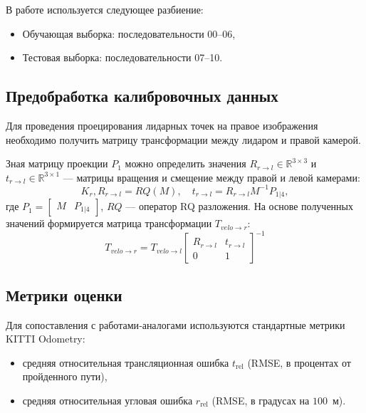 В работе используется следующее разбиение:
\begin{itemize}
    \item Обучающая выборка: последовательности 00--06,
    \item Тестовая выборка: последовательности 07--10.
\end{itemize}


\subsection{Предобработка калибровочных данных}
Для проведения проецирования лидарных точек на правое изображения необходимо получить 
матрицу трансформации между лидаром и правой камерой.

Зная матрицу проекции $P_1$ можно определить значения 
$R_{r\rightarrow l} \in \mathbb{R}^{3\times 3}$ и $t_{r \rightarrow l} \in \mathbb{R}^{3\times 1}$ ---
матрицы вращения и смещение между правой и левой камерами:
\begin{equation*}
  K_{r}, R_{r\rightarrow l} = RQ(M), \quad t_{r \rightarrow l} = R_{r\rightarrow l}M^{-1}P_{1|4},
\end{equation*}
где $P_1 = \begin{bmatrix}
  M & P_{1|4}
\end{bmatrix}$, $RQ$ --- оператор RQ разложения. На основе полученных значений формируется матрица трансформации $T_{velo\rightarrow r}$:
\begin{equation*}
  T_{velo\rightarrow r} = T_{velo\rightarrow l} \begin{bmatrix}
    R_{r\rightarrow l} & t_{r \rightarrow l} \\ 0  & 1
  \end{bmatrix}^{-1}
\end{equation*}

\subsection{Метрики оценки}

Для сопоставления с работами‑аналогами используются
стандартные метрики KITTI Odometry:
\begin{itemize}
    \item средняя относительная трансляционная ошибка
          ${t}_{\mathrm{rel}}$ (RMSE, в процентах от пройденного пути),
    \item средняя относительная угловая ошибка
          ${r}_{\mathrm{rel}}$ (RMSE, в градусах на $100$~м).
\end{itemize}


